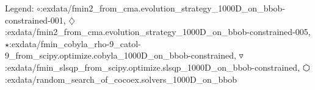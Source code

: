Legend: {\color{NavyBlue}$\circ$}:exdata/fmin2\_from\_cma.evolution\_strategy\_1000D\_on\_bbob-constrained-001, {\color{Magenta}$\diamondsuit$}:exdata/fmin2\_from\_cma.evolution\_strategy\_1000D\_on\_bbob-constrained-005, {\color{Orange}$\star$}:exdata/fmin\_cobyla\_rho-9\_catol-9\_from\_scipy.optimize.cobyla\_1000D\_on\_bbob-constrained, {\color{CornflowerBlue}$\triangledown$}:exdata/fmin\_slsqp\_from\_scipy.optimize.slsqp\_1000D\_on\_bbob-constrained, {\color{red}$\varhexagon$}:exdata/random\_search\_of\_cocoex.solvers\_1000D\_on\_bbob